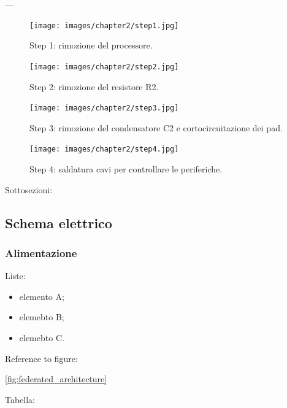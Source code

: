 ---

\begin{figure}[H]
    \centering
    \begin{minipage}[b]{0.45\textwidth}
      \texttt{[image: images/chapter2/step1.jpg]}
      \caption{Step 1: rimozione del processore.}\label{fig:step1}
    \end{minipage}
    \hfill
    \begin{minipage}[b]{0.45\textwidth}
      \texttt{[image: images/chapter2/step2.jpg]}
      \caption{Step 2: rimozione del resistore R2.}\label{fig:step2}
      \end{minipage}
  \end{figure}

  \begin{figure}[H]
    \centering
    \begin{minipage}[b]{0.45\textwidth}
      \texttt{[image: images/chapter2/step3.jpg]}
      \caption{Step 3: rimozione del condensatore C2 e cortocircuitazione dei pad.}\label{fig:step2}
    \end{minipage}
    \hfill
    \begin{minipage}[b]{0.45\textwidth}
      \texttt{[image: images/chapter2/step4.jpg]}
      \caption{Step 4: saldatura cavi per controllare le periferiche.}\label{fig:step2}
        \end{minipage}
\end{figure}

Sottosezioni:

\subsection{Schema elettrico}

\subsubsection{Alimentazione}

Liste:

\begin{itemize}
  \setlength{\itemsep}{2pt}
  \setlength{\parskip}{2pt}
  \item elemento A;
  \item elemebto B;
  \item elemebto C.
\end{itemize}


Reference to figure:

\ref{fig:federated_architecture}

Tabella:

